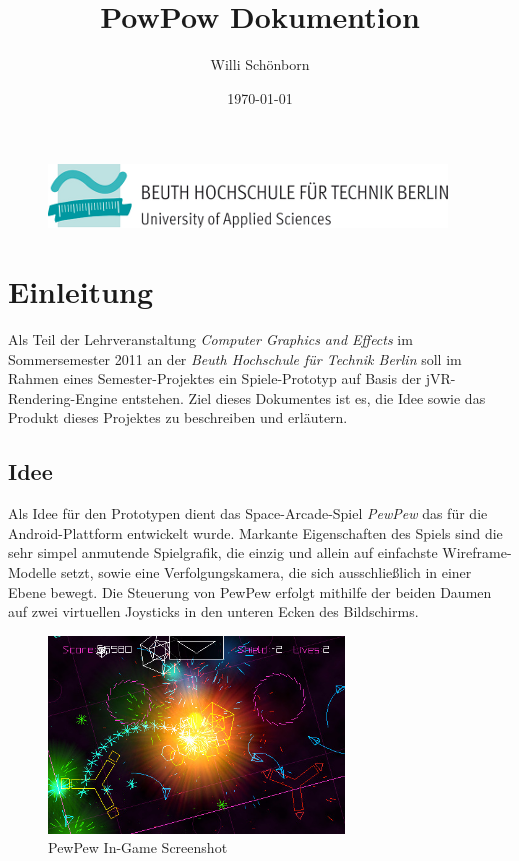 \documentclass[a4paper]{article}
\title{PowPow Dokumention}
\author{Willi Schönborn}
\date{\today}
\begin{document}
\begin{figure}[H]
\centering
\includegraphics{beuth.png}
\maketitle
\end{figure}

\newpage
\tableofcontents

\newpage
\section{Einleitung}
Als Teil der Lehrveranstaltung \textit{Computer Graphics and Effects} im Sommersemester 2011 an der \textit{Beuth Hochschule für Technik Berlin} soll im Rahmen eines Semester-Projektes ein Spiele-Prototyp auf Basis der jVR-Rendering-Engine entstehen. Ziel dieses Dokumentes ist es, die Idee sowie das Produkt dieses Projektes zu beschreiben und erläutern.

\subsection{Idee}
Als Idee für den Prototypen dient das Space-Arcade-Spiel \textit{PewPew} das für die Android-Plattform entwickelt wurde. Markante Eigenschaften des Spiels sind die sehr simpel anmutende Spielgrafik, die einzig und allein auf  einfachste Wireframe-Modelle setzt, sowie eine Verfolgungskamera, die sich ausschließlich in einer Ebene bewegt. Die Steuerung von PewPew erfolgt mithilfe der beiden Daumen auf zwei virtuellen Joysticks in den unteren Ecken des Bildschirms.

\begin{figure}[H]
\centering
\includegraphics[width=0.7\textwidth]{PewPew-iPhone-App-Review.jpg}
\caption{PewPew In-Game Screenshot}
\end{figure}
\end{document}
